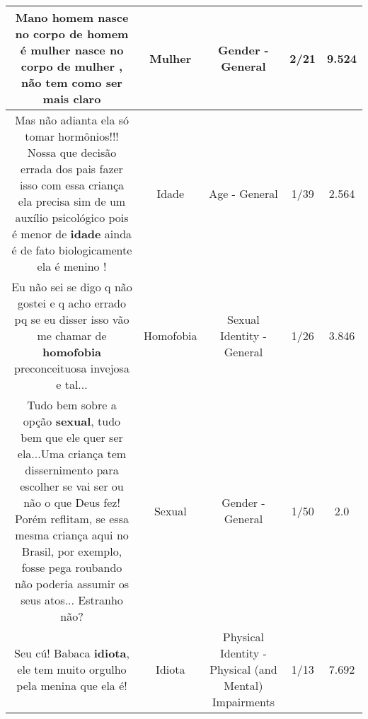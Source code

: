 \documentclass[11pt]{article}
\newlength\mylength
\begin{document}
\begin{center}
\begin{longtable}{|C{.65\mylength}|C{.30\mylength}|C{.12\mylength}|C{.12\mylength}|C{.12\mylength}|}
  \small Mano homem nasce no corpo de homem é \textbf{mulher} nasce no corpo de \textbf{mulher} , não tem como ser mais claro\normalsize   & Mulher & Gender - General & 2/21 & 9.524 \\  \hline
  \small Mas não adianta ela só tomar hormônios!!! Nossa que decisão errada dos pais fazer isso com essa criança ela precisa sim de um auxílio psicológico pois é menor de \textbf{idade} ainda é de fato biologicamente ela é menino !\normalsize   & Idade & Age - General & 1/39 & 2.564 \\  \hline
  \small Eu não sei se digo q não gostei e q acho errado pq se eu disser isso vão me chamar de \textbf{homofobia} preconceituosa invejosa e tal...\normalsize   & Homofobia & Sexual Identity - General & 1/26 & 3.846 \\  \hline
  \small Tudo bem sobre a opção \textbf{sexual}, tudo bem que ele quer ser ela...Uma criança tem dissernimento para escolher se vai ser ou não o que Deus fez! Porém reflitam, se essa mesma criança aqui no Brasil, por exemplo, fosse pega roubando não poderia assumir os seus atos... Estranho não?\normalsize   & Sexual & Gender - General & 1/50 & 2.0 \\  \hline
  \small Seu cú! Babaca \textbf{idiota}, ele tem muito orgulho pela menina que ela é!\normalsize   & Idiota & Physical Identity - Physical (and Mental) Impairments & 1/13 & 7.692 \\  \hline

\end{longtable}
\end{center}
\end{document}
